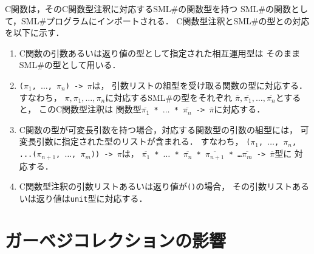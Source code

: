 \documentclass{jbook}
\newcommand{\smlsharp}{SML\#}
\begin{document}
	C関数は，そのC関数型注釈に対応する\smlsharp{}の関数型を持つ
\smlsharp{}の関数として，\smlsharp{}プログラムにインポートされる．
	C関数型注釈と\smlsharp{}の型との対応を以下に示す．
\begin{enumerate}
\item
	C関数の引数あるいは返り値の型として指定された相互運用型は
そのまま\smlsharp{}の型として用いる．
\item
	{\tt ($\pi_1$, $\ldots$, $\pi_n$) -> $\pi$}は，
引数リストの組型を受け取る関数の型に対応する．
	すなわち，
$\pi, \pi_1, \ldots, \pi_n$に対応する\smlsharp{}の型をそれぞれ
$\overline{\pi}, \overline{\pi_1}, \ldots, \overline{\pi_n}$とすると，
このC関数型注釈は
関数型{\tt $\overline{\pi_1}$ * $\ldots$ * $\overline{\pi_n}$ -> $\overline{\pi}$}に対応する．
\item
	C関数の型が可変長引数を持つ場合，対応する関数型の引数の組型には，
可変長引数に指定された型のリストが含まれる．
	すなわち，
{\tt ($\pi_1$, $\ldots$, $\pi_n$, ...($\pi_{n+1}$, $\ldots$, $\pi_{m}$)) -> $\pi$}は，
{\tt $\overline{\pi_1}$ * $\ldots$ * $\overline{\pi_n}$ * $\overline{\pi_{n+1}}$ * \ldots * $\overline{\pi_{m}}$ -> $\overline{\pi}$}型に
対応する．
\item
	C関数型注釈の引数リストあるいは返り値が{\tt ()}の場合，
その引数リストあるいは返り値は{\tt unit}型に対応する．
\end{enumerate}


\section{ガーベジコレクションの影響}
\label{sec:gc}
\end{document}
